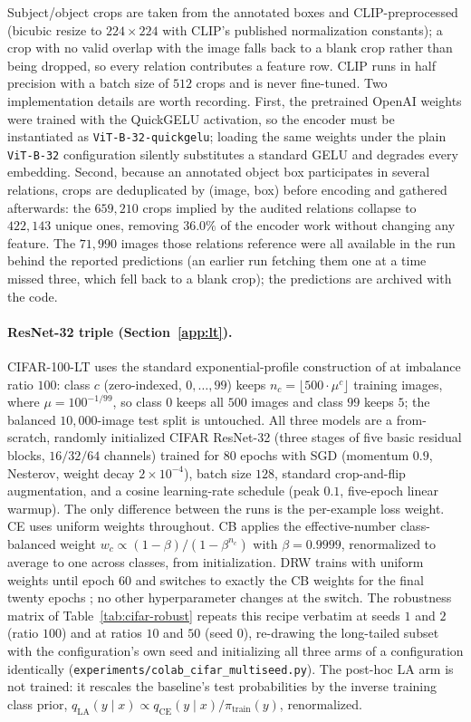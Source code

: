 Subject/object crops are taken from the annotated boxes and CLIP-preprocessed (bicubic
resize to $224\times224$ with CLIP's published normalization constants); a crop with no
valid overlap with the image falls back to a blank crop rather than being dropped, so
every relation contributes a feature row. CLIP runs in half precision with a batch size
of $512$ crops and is never fine-tuned. Two implementation details are worth recording.
First, the pretrained OpenAI weights were trained with the QuickGELU activation, so the
encoder must be instantiated as \texttt{ViT-B-32-quickgelu}; loading the same weights
under the plain \texttt{ViT-B-32} configuration silently substitutes a standard GELU and
degrades every embedding. Second, because an annotated object box participates in
several relations, crops are deduplicated by (image, box) before encoding and gathered
afterwards: the $659{,}210$ crops implied by the audited relations collapse to
$422{,}143$ unique ones, removing $36.0\%$ of the encoder work without changing any
feature. The $71{,}990$ images those relations reference were all available in the run
behind the reported predictions (an earlier run fetching them one at a time missed three,
which fell back to a blank crop); the predictions are archived with the code.

\paragraph{ResNet-32 triple (Section~\ref{app:lt}).} CIFAR-100-LT uses the standard
exponential-profile construction of \citet{cui2019classbalanced} at imbalance ratio
$100$: class $c$ (zero-indexed, $0,\ldots,99$) keeps
$n_c=\lfloor 500\cdot\mu^{c}\rfloor$ training images, where
$\mu=100^{-1/99}$, so class $0$ keeps all $500$ images and class $99$ keeps $5$; the
balanced $10{,}000$-image test split is untouched. All three models are a from-scratch,
randomly initialized CIFAR ResNet-32 (three stages of five basic residual blocks,
$16/32/64$ channels) trained for $80$ epochs with SGD (momentum $0.9$, Nesterov,
weight decay $2\times10^{-4}$), batch size $128$, standard crop-and-flip augmentation,
and a cosine learning-rate schedule (peak $0.1$, five-epoch linear warmup). The only
difference between the runs is the per-example loss weight. CE uses uniform weights
throughout. CB applies the effective-number class-balanced weight
$w_c\propto(1-\beta)/(1-\beta^{n_c})$ with $\beta=0.9999$, renormalized to average to
one across classes, from initialization. DRW trains with uniform weights until epoch
$60$ and switches to exactly the CB weights for the final twenty epochs
\citep{cao2019learning}; no other hyperparameter changes at the switch. The robustness
matrix of Table~\ref{tab:cifar-robust} repeats this recipe verbatim at seeds $1$ and $2$
(ratio $100$) and at ratios $10$ and $50$ (seed $0$), re-drawing the long-tailed subset
with the configuration's own seed and initializing all three arms of a configuration
identically (\texttt{experiments/colab\_cifar\_multiseed.py}). The post-hoc LA arm is not
trained: it rescales the baseline's test probabilities by the inverse training class
prior, $q_{\mathrm{LA}}(y\mid x)\propto q_{\mathrm{CE}}(y\mid x)/\pi_{\mathrm{train}}(y)$,
renormalized.

